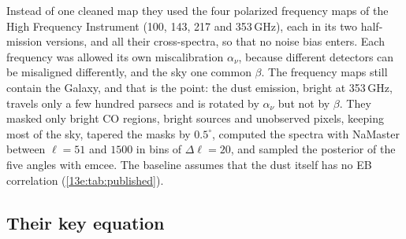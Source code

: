 Instead of one cleaned map they used the four polarized frequency maps of the High Frequency Instrument
(100, 143, 217 and 353\,GHz), each in its two half-mission versions, and all their cross-spectra, so that no
noise bias enters. Each frequency was allowed its own miscalibration $\alpha_\nu$, because different detectors
can be misaligned differently, and the sky one common $\beta$. The frequency maps still contain the Galaxy,
and that is the point: the dust emission, bright at 353\,GHz, travels only a few hundred parsecs and is rotated
by $\alpha_\nu$ but not by $\beta$. They masked only bright CO regions, bright sources and unobserved pixels,
keeping most of the sky, tapered the masks by $0.5^\circ$, computed the spectra with NaMaster
\cite{Alonso2019} between $\ell=51$ and $1500$ in bins of $\Delta\ell=20$, and sampled the posterior of the five
angles with emcee. The baseline assumes that the dust itself has no EB correlation
(\cref{13e:tab:published}).

\subsection{Their key equation}
\label{13e:sec:their-equation}

